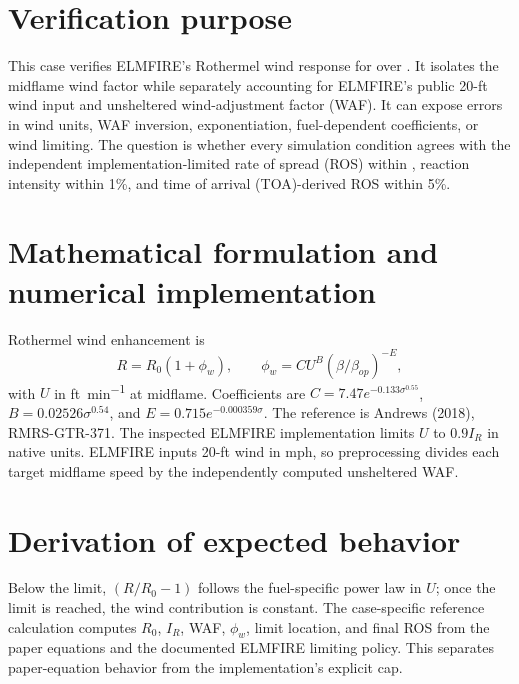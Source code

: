 \section{Verification purpose}

This case verifies ELMFIRE's Rothermel wind response for \FuelSet{} over \WindSet.  It isolates the midflame wind factor while separately accounting for ELMFIRE's public 20-ft wind input and unsheltered wind-adjustment factor (WAF).  It can expose errors in wind units, WAF inversion, exponentiation, fuel-dependent coefficients, or wind limiting.  The question is whether every simulation condition agrees with the independent implementation-limited rate of spread (ROS) within \RosTolerance{}, reaction intensity within 1\%, and time of arrival (TOA)-derived ROS within 5\%.

\section{Mathematical formulation and numerical implementation}
Rothermel wind enhancement is
\begin{equation}R=R_0(1+\phi_w),\qquad \phi_w=C U^B(\beta/\beta_{op})^{-E},\end{equation}
with $U$ in \si{ft.min^{-1}} at midflame.  Coefficients are $C=7.47e^{-0.133\sigma^{0.55}}$, $B=0.02526\sigma^{0.54}$, and $E=0.715e^{-0.000359\sigma}$.  The reference is Andrews (2018), RMRS-GTR-371.  The inspected ELMFIRE implementation limits $U$ to $0.9I_R$ in native units.  ELMFIRE inputs 20-ft wind in mph, so preprocessing divides each target midflame speed by the independently computed unsheltered WAF.

\section{Derivation of expected behavior}
Below the limit, $(R/R_0-1)$ follows the fuel-specific power law in $U$; once the limit is reached, the wind contribution is constant.  The case-specific reference calculation computes $R_0$, $I_R$, WAF, $\phi_w$, limit location, and final ROS from the paper equations and the documented ELMFIRE limiting policy.  This separates paper-equation behavior from the implementation's explicit cap.

